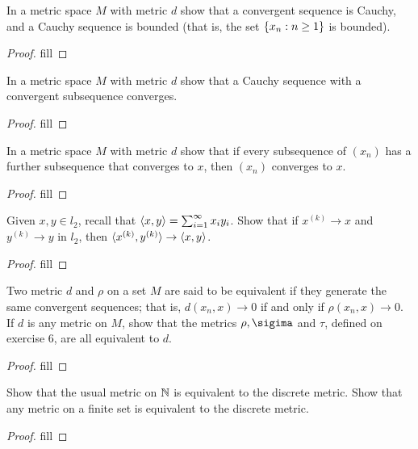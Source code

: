 \begin{exercise}{36}
In a metric space $M$ with metric $d$ show that a convergent sequence is Cauchy, and a Cauchy sequence is bounded (that is, the set $\{x_n:n\geq 1\}$ is bounded).
\end{exercise}
\begin{proof}
fill
\end{proof} 

\begin{exercise}{37}
In a metric space $M$ with metric $d$ show that a Cauchy sequence with a convergent subsequence converges.
\end{exercise}
\begin{proof}
fill
\end{proof} 

\begin{exercise}{39}
In a metric space $M$ with metric $d$ show that if every subsequence of $(x_n)$ has a further subsequence that converges to $x$, then $(x_n)$ converges to $x$.
\end{exercise}
\begin{proof}
fill
\end{proof} 

\begin{exercise}{41}
Given $x,y\in l_2$, recall that $\langle x,y\rangle=\sum_{i=1}^\infty x_iy_i$. Show that if $x^{(k)}\to x$ and $y^{(k)}\to y$ in $l_2$, then $\langle x^{(k)},y^{(k)}\rangle\to\langle x,y\rangle$.
\end{exercise}
\begin{proof}
fill
\end{proof} 

\begin{exercise}{42}
Two metric $d$ and $\rho$ on a set $M$ are said to be equivalent if they generate the same convergent sequences; that is, $d(x_n,x)\to 0$ if and only if $\rho(x_n,x)\to 0$. If $d$ is any metric on $M$, show that the metrics $\rho,\sigima$ and $\tau$, defined on exercise 6, are all equivalent to $d$.
\end{exercise}
\begin{proof}
fill
\end{proof} 

\begin{exercise}{43}
Show that the usual metric on $\mathbb{N}$ is equivalent to the discrete metric. Show that any metric on a finite set is equivalent to the discrete metric.
\end{exercise}
\begin{proof}
fill
\end{proof} 

